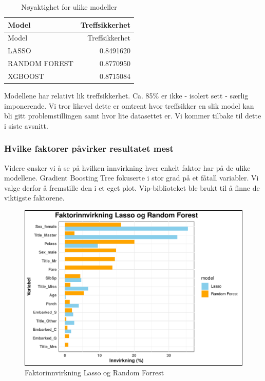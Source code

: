 \documentclass[
]{article}
\begin{document}
\begin{longtable}[]{@{}lr@{}}
\caption{Nøyaktighet for ulike modeller}\tabularnewline
\toprule\noalign{}
Model & Treffsikkerhet \\
\midrule\noalign{}
\endfirsthead
\toprule\noalign{}
Model & Treffsikkerhet \\
\midrule\noalign{}
\endhead
\bottomrule\noalign{}
\endlastfoot
LASSO & 0.8491620 \\
RANDOM FOREST & 0.8770950 \\
XGBOOST & 0.8715084 \\
\end{longtable}

Modellene har relativt lik treffsikkerhet. Ca. 85\% er ikke - isolert
sett - særlig imponerende. Vi tror likevel dette er omtrent hvor
treffsikker en slik model kan bli gitt problemstillingen samt hvor lite
datasettet er. Vi kommer tilbake til dette i siste avsnitt.

\subsubsection{Hvilke faktorer påvirker resultatet
mest}\label{hvilke-faktorer-puxe5virker-resultatet-mest}

Videre ønsker vi å se på hvilken innvirkning hver enkelt faktor har på
de ulike modellene. Gradient Boosting Tree fokuserte i stor grad på et
fåtall variabler. Vi valge derfor å fremstille den i et eget plot.
Vip-biblioteket ble brukt til å finne de viktigste faktorene.

\begin{figure}[H]

{\centering \includegraphics[width=0.8\linewidth]{presentation_files/figure-latex/unnamed-chunk-11-1} 

}

\caption{Faktorinnvirkning Lasso og Random Forrest}\label{fig:unnamed-chunk-11}
\end{figure}
\end{document}
